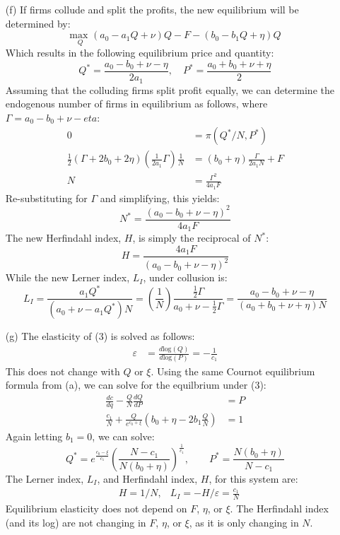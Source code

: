 \documentclass{article}
\newcommand{\loge}[1]{\text{log}\left(#1\right)}
\newcommand{\usmax}[1]{\underset{#1}{\text{max }}}
\begin{document}
\begin{itemize}
    \item[(f)] If firms collude and split the profits, the new equilibrium will be determined by: \[
      \usmax{Q}(a_0-a_1Q+\nu)Q - F - (b_0-b_1Q + \eta)Q
    \]
    Which results in the following equilibrium price and quantity:\[
      Q^* = \frac{a_0 - b_0 + \nu - \eta}{2a_1},\quad P^* = \frac{a_0 +
       b_0 + \nu + \eta}{2}
    \]
    Assuming that the colluding firms split profit equally, we can determine the endogenous number of firms in equilibrium as follows, where ${\Gamma=a_0-b_0+\nu-eta}$:\begin{align*}
      0 &= \pi(Q^*/N,P^*)                                    \\
      \frac{1}{2}\left(\Gamma+2b_0 + 2\eta\right)\left(\frac{1}{2a_1}\Gamma\right)\frac{1}{N} &= (b_0 + \eta)\frac{\Gamma}{2a_1N} + F                \\
      N &= \frac{\Gamma^2}{4a_1F}
    \end{align*}
    Re-substituting for $\Gamma$ and simplifying, this yields:\[
      N^* = \frac{(a_0-b_0+\nu-\eta)^2}{4a_1F}
    \]
    The new Herfindahl index, $H$, is simply the reciprocal of $N^*$:\[
      H = \frac{4a_1F}{(a_0-b_0+\nu-\eta)^2}
    \]
    While the new Lerner index, $L_I$, under collusion is:\[
      L_I = \frac{a_1Q^*}{(a_0 + \nu - a_1Q^*)N} = \left(\frac{1}{N}\right)\frac{\frac{1}{2}\Gamma}{a_0+\nu-\frac{1}{2}\Gamma} = \frac{a_0-b_0+\nu-\eta}{(a_0 + b_0 + \nu + \eta)N} 
    \]

    \item[(g)] The elasticity of (3) is solved as follows: \begin{align*}
      \varepsilon &= \frac{d\loge{Q}}{d\loge{P}}= -\frac{1}{c_1}
    \end{align*}
    This does not change with $Q$ or $\xi$. Using the same Cournot equilibrium formula from (a), we can solve for the equilbrium under (3):\begin{align*}
      \frac{dc}{dq} - \frac{Q}{N}\frac{dQ}{dP} &= P \\
      \frac{c_1}{N} + \frac{Q}{e^{c_0 + \xi}}\left(b_0+\eta-2b_1\frac{Q}{N}\right) &= 1
    \end{align*}
    Again letting ${b_1=0}$, we can solve:\[
      Q^* = e^{\frac{c_0-\xi}{c_1}}\left(\frac{N-c_1}{N(b_0+\eta)}\right)^\frac{1}{c_1}, \quad\quad 
      P^* = \frac{N(b_0+\eta)}{N-c_1}
    \]
    The Lerner index, $L_I$, and Herfindahl index, $H$, for this system are:\begin{align*}
      &H = 1/N, &L_I = -H/\varepsilon = \frac{c_1}{N}
    \end{align*}
    Equilibrium elasticity does not depend on $F$, $\eta$, or $\xi$. The Herfindahl index (and its log) are not changing in $F$, $\eta$, or $\xi$, as it is only changing in $N$. 
\end{itemize}
\end{document}
